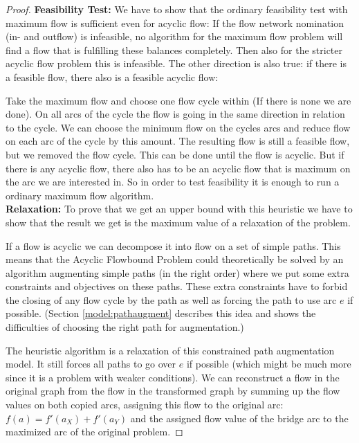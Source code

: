 \begin{proof}
\textbf{Feasibility Test: }We have to show that the ordinary feasibility test with maximum flow is sufficient even for 
acyclic flow: If the flow network nomination (in- and outflow) is infeasible, no algorithm for the 
maximum flow problem will find a flow that is fulfilling these balances completely. Then also for the stricter acyclic 
flow problem this is infeasible. The other direction is also true: if there is a feasible flow, there also is a 
feasible acyclic flow:

Take the maximum flow and choose one flow cycle within (If there is none we are done). On all arcs of the cycle the 
flow is going in the same direction in relation to the cycle. We can choose the minimum flow on the cycles arcs and 
reduce flow on each arc of the cycle by this amount. The resulting flow is still a feasible flow, but we removed the 
flow cycle. This can be done until the flow is acyclic. But if there is any acyclic flow, there also has to be an 
acyclic flow that is maximum on the arc we are interested in. So in order to test feasibility it is enough to run a 
ordinary maximum flow algorithm.\\


\textbf{Relaxation: }To prove that we get an upper bound with this heuristic we have to show that the result we 
get is the maximum value of a relaxation of the problem. 

If a flow is acyclic we can decompose it into flow on a set of simple paths. This means that 
the Acyclic Flowbound Problem could theoretically be solved by an algorithm augmenting simple paths (in the 
right order) where we put some extra constraints and objectives on these paths. These extra constraints have to forbid 
the closing of any flow cycle by the path as well as forcing the path to use arc $e$ if possible. (Section 
\ref{model:pathaugment} describes this idea and shows the difficulties of choosing the right path for augmentation.)

The heuristic algorithm is a relaxation of this constrained path augmentation model. It still forces all paths to go 
over $e$ if possible (which might be much more since it is a problem with weaker conditions). 
We can reconstruct a flow in the original graph from the flow in the transformed graph by summing up the flow values on 
both copied arcs, assigning this flow to the original arc: $f(a)=f'(a_X)+f'(a_Y)$ and the assigned flow value of the 
bridge arc to the maximized arc of the original problem. 


\end{proof}
